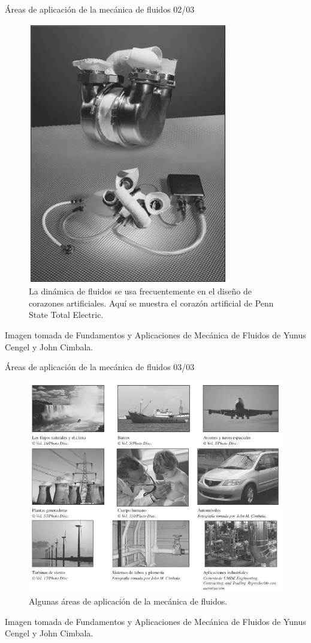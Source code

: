 \begin{frame}{Áreas de aplicación de la mecánica de fluidos 02/03}
\justifying
\begin{figure}[H]
\centering
\includegraphics[scale=0.2]{Section_Files/imagenes/sec01_0101_Fig01-07.png}
\caption{La dinámica de fluidos se usa frecuentemente en el diseño de corazones artificiales. Aquí se muestra el corazón artificial de Penn State Total Electric.}
\label{fig: Figura1-07}
\end{figure}
Imagen tomada de Fundamentos y Aplicaciones de Mecánica de Fluidos de Yunus Cengel y John Cimbala.
\end{frame}
	
\begin{frame}{Áreas de aplicación de la mecánica de fluidos 03/03}
\justifying
\begin{figure}[H]
\centering
\includegraphics[scale=0.2]{Section_Files/imagenes/sec01_0101_Fig01-08.png}
\caption{Algunas áreas de aplicación de la mecánica de fluidos.}
\label{fig: Figura1-08}
\end{figure}
Imagen tomada de Fundamentos y Aplicaciones de Mecánica de Fluidos de Yunus Cengel y John Cimbala.
\end{frame}


